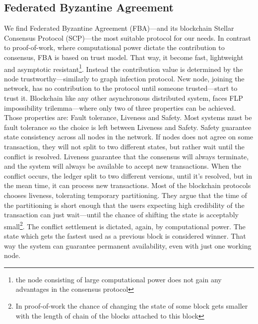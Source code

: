 \documentclass[nostrict]{szablonPG}
\begin{document}
\subsection{Federated Byzantine Agreement}
We find Federated Byzantine Agreement (FBA)––and its blockchain Stellar Consensus Protocol (SCP)\cite{mazieres2015stellar}––the most suitable protocol for our needs. In contrast to proof-of-work, where computational power dictate the contribution to consensus, FBA is based on trust model. That way, it become fast, lightweight and asymptotic resistant\footnote{the node consisting of large computational power does not gain any advantages in the consensus protocol}. Instead the contribution value is determined by the node trustworthy––similarly to graph infection protocol. New node, joining the network, has no contribution to the protocol until someone trusted––start to trust it.
Blockchain like any other asynchronous distributed system, faces FLP\cite{fischer1985impossibility} impossibility trilemma––where only two of three properties can be achieved. Those properties are: Fault tolerance, Liveness and Safety. Most systems must be fault tolerance so the choice is left between Liveness and Safety. Safety guarantee state consistency across all nodes in the network. If nodes does not agree on some transaction, they will not split to two different states, but rather wait until the conflict is resolved. Liveness guarantee that the consensus will always terminate, and the system will always be available to accept new transactions. When the conflict occurs, the ledger split to two different versions, until it's resolved, but in the mean time, it can process new transactions. Most of the blockchain protocols chooses liveness, tolerating temporary partitioning. They argue that the time of the partitioning is short enough that the users expecting high credibility of the transaction can just wait---until the chance of shifting the state is acceptably small\footnote{In proof-of-work the chance of changing the state of some block gets smaller with the length of chain of the blocks attached to this block}. The conflict settlement is dictated, again, by computational power. The state which gets the fastest used as a previous block is considered winner. That way the system can guarantee permanent availability, even with just one working node. 
\end{document}
